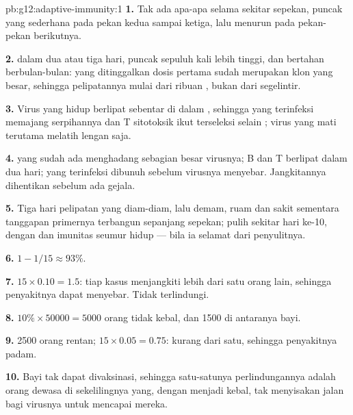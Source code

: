 \begin{solution}{pb:g12:adaptive-immunity:1}
\textbf{1.} Tak ada apa-apa selama sekitar sepekan, puncak yang
sederhana pada pekan kedua sampai ketiga, lalu menurun pada pekan-pekan
berikutnya.

\textbf{2.}  dalam dua atau tiga hari, puncak sepuluh kali
lebih tinggi, dan bertahan berbulan-bulan:  yang
ditinggalkan dosis pertama sudah merupakan klon yang besar, sehingga
pelipatannya mulai dari ribuan , bukan dari segelintir.

\textbf{3.} Virus yang hidup berlipat sebentar di dalam , sehingga
 yang terinfeksi memajang serpihannya dan  T sitotoksik ikut
terseleksi selain ; virus yang mati terutama melatih lengan
 saja.

\textbf{4.}  yang sudah ada menghadang sebagian besar virusnya;
 B dan T berlipat dalam dua hari;  yang terinfeksi
dibunuh sebelum virusnya menyebar. Jangkitannya dihentikan sebelum ada
gejala.

\textbf{5.} Tiga hari pelipatan yang diam-diam, lalu demam, ruam dan
sakit sementara tanggapan primernya terbangun sepanjang sepekan;
pulih sekitar hari ke-10, dengan  dan imunitas seumur hidup
--- bila ia selamat dari penyulitnya.

\textbf{6.} $1 - 1/15 \approx 93\%$.

\textbf{7.} $15 \times 0.10 = 1.5$: tiap kasus menjangkiti lebih dari
satu orang lain, sehingga penyakitnya dapat menyebar. Tidak terlindungi.

\textbf{8.} $10\% \times \num{50000} = 5000$ orang tidak kebal, dan
1500 di antaranya bayi.

\textbf{9.} 2500 orang rentan; $15 \times 0.05 = 0.75$: kurang dari
satu, sehingga penyakitnya padam.

\textbf{10.} Bayi tak dapat divaksinasi, sehingga satu-satunya
perlindungannya adalah orang dewasa di sekelilingnya yang, dengan
menjadi kebal, tak menyisakan jalan bagi virusnya untuk mencapai mereka.


\end{solution}
